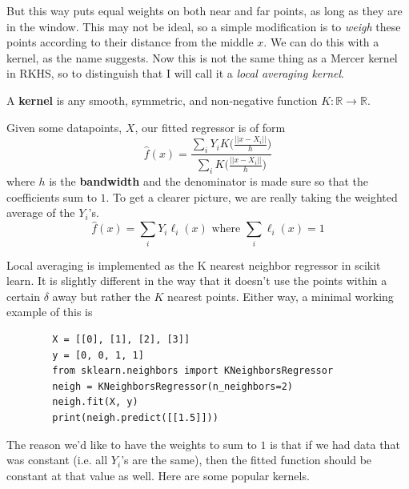 \documentclass{article}
\begin{document}
    But this way puts equal weights on both near and far points, as long as they are in the window. This may not be ideal, so a simple modification is to \textit{weigh} these points according to their distance from the middle $x$. We can do this with a kernel, as the name suggests. Now this is not the same thing as a Mercer kernel in RKHS, so to distinguish that I will call it a \textit{local averaging kernel}. 

    \begin{definition}
      A \textbf{kernel} is any smooth, symmetric, and non-negative function $K : \mathbb{R} \to \mathbb{R}$.  
    \end{definition}

    \begin{definition}
      Given some datapoints, $X$, our fitted regressor is of form 
      \begin{equation}
        \hat{f} (x) = \frac{\sum_{i} Y_i K \bigg( \frac{||x - X_i||}{h} \bigg)}{\sum_{i} K \bigg( \frac{||x - X_i||}{h} \bigg)}
      \end{equation}
      where $h$ is the \textbf{bandwidth} and the denominator is made sure so that the coefficients sum to $1$. To get a clearer picture, we are really taking the weighted average of the $Y_i$'s. 
      \begin{equation}
        \hat{f} (x) = \sum_{i} Y_i \ell_i (x) \text{ where } \sum_{i} \ell_i (x) = 1
      \end{equation}
    \end{definition}

    \begin{code}
      Local averaging is implemented as the K nearest neighbor regressor in scikit learn. It is slightly different in the way that it doesn't use the points within a certain $\delta$ away but rather the $K$ nearest points. Either way, a minimal working example of this is 
      \begin{lstlisting}
        X = [[0], [1], [2], [3]]
        y = [0, 0, 1, 1]
        from sklearn.neighbors import KNeighborsRegressor
        neigh = KNeighborsRegressor(n_neighbors=2)
        neigh.fit(X, y)
        print(neigh.predict([[1.5]])) 
      \end{lstlisting}
    \end{code}

    The reason we'd like to have the weights to sum to $1$ is that if we had data that was constant (i.e. all $Y_i$'s are the same), then the fitted function should be constant at that value as well. Here are some popular kernels. 
\end{document}
